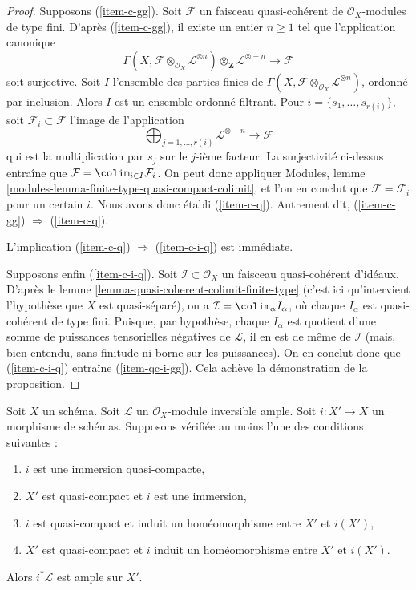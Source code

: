 \begin{proof}
\medskip\noindent
Supposons (\ref{item-c-gg}). Soit $\mathcal{F}$ un faisceau quasi-cohérent
de $\mathcal{O}_X$-modules de type fini.
D'après (\ref{item-c-gg}), il existe un entier $n \geq 1$ tel que
l'application canonique
$$
\Gamma(X, \mathcal{F} \otimes_{\mathcal{O}_X} \mathcal{L}^{\otimes n})
\otimes_{\mathbf{Z}} \mathcal{L}^{\otimes -n}
\longrightarrow
\mathcal{F}
$$
soit surjective. Soit $I$ l'ensemble des parties finies de
$\Gamma(X, \mathcal{F} \otimes_{\mathcal{O}_X} \mathcal{L}^{\otimes n})$,
ordonné par inclusion. Alors $I$ est un ensemble ordonné filtrant.
Pour $i = \{s_1, \ldots, s_{r(i)}\}$, soit $\mathcal{F}_i \subset \mathcal{F}$
l'image de l'application
$$
\bigoplus\nolimits_{j = 1, \ldots, r(i)} \mathcal{L}^{\otimes -n}
\longrightarrow
\mathcal{F}
$$
qui est la multiplication par $s_j$ sur le $j$-ième facteur. La surjectivité ci-dessus
entraîne que $\mathcal{F} = \colim_{i \in I} \mathcal{F}_i$.
On peut donc appliquer Modules, lemme \ref{modules-lemma-finite-type-quasi-compact-colimit},
et l'on en conclut que
$\mathcal{F} = \mathcal{F}_i$ pour un certain $i$.
Nous avons donc établi (\ref{item-c-q}). Autrement dit,
(\ref{item-c-gg}) $\Rightarrow$ (\ref{item-c-q}).

\medskip\noindent
L'implication (\ref{item-c-q}) $\Rightarrow$ (\ref{item-c-i-q}) est immédiate.

\medskip\noindent
Supposons enfin (\ref{item-c-i-q}).
Soit $\mathcal{I} \subset \mathcal{O}_X$ un faisceau quasi-cohérent
d'idéaux. D'après le lemme \ref{lemma-quasi-coherent-colimit-finite-type}
(c'est ici qu'intervient l'hypothèse que $X$ est quasi-séparé),
on a $\mathcal{I} = \colim_\alpha I_\alpha$, où
chaque $I_\alpha$ est quasi-cohérent de type fini. Puisque, par hypothèse,
chaque $I_\alpha$ est quotient d'une somme de puissances tensorielles négatives de
$\mathcal{L}$, il en est de même de $\mathcal{I}$ (mais, bien entendu,
sans finitude ni borne sur les puissances). On en conclut donc
que (\ref{item-c-i-q}) entraîne (\ref{item-qc-i-gg}).
Cela achève la démonstration de la proposition.
\end{proof}

\begin{lemma}
\label{lemma-ample-on-locally-closed}
Soit $X$ un schéma. Soit $\mathcal{L}$ un
$\mathcal{O}_X$-module inversible ample. Soit $i : X' \to X$ un morphisme de schémas.
Supposons vérifiée au moins l'une des conditions suivantes :
\begin{enumerate}
\item $i$ est une immersion quasi-compacte,
\item $X'$ est quasi-compact et $i$ est une immersion,
\item $i$ est quasi-compact et induit un homéomorphisme
entre $X'$ et $i(X')$,
\item $X'$ est quasi-compact et $i$ induit un homéomorphisme
entre $X'$ et $i(X')$.
\end{enumerate}
Alors $i^*\mathcal{L}$ est ample sur $X'$.
\end{lemma}

